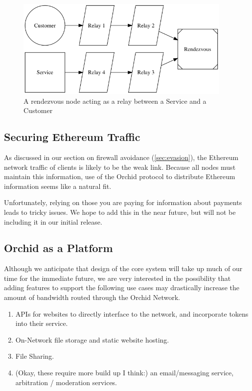 \documentclass{article}
\newcommand{\orchid}{Orchid}
\newcommand{\Orchid}{\orchid}
\begin{document}
\begin{figure}[htbp]
  \centering
  \includegraphics[width = 300pt]{sttRttc}
  \caption{A rendezvous node acting as a relay between a Service and a Customer}
\end{figure}

\subsection{Securing Ethereum Traffic}
\label{securing-eth}

As discussed in our section on firewall avoidance (\ref{sec:evasion}),
the Ethereum network traffic of clients is likely to be the weak
link. Because all nodes must maintain this information, use of the
\Orchid{} protocol to distribute Ethereum information seems like a
natural fit.

Unfortunately, relying on those you are paying for information about
payments leads to tricky issues. We hope to add this in the near
future, but will not be including it in our initial release.

\subsection{\Orchid{} as a Platform}

Although we anticipate that design of the core system will take up
much of our time for the immediate future, we are very interested in
the possibility that adding features to support the following use
cases may drastically increase the amount of bandwidth routed through
the \Orchid{} Network.

\begin{enumerate}
\item APIs for websites to directly interface to the network, and
  incorporate tokens into their service.
\item On-Network file storage and static website hosting.
\item File Sharing.
\item (Okay, these require more build up I think:) an email/messaging
  service, arbitration / moderation services.
\end{enumerate}


\nocite{*}
\printbibliography
\end{document}
